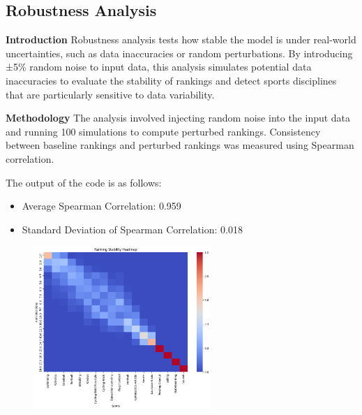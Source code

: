 \documentclass[12pt]{article}
\begin{document}
\subsection{Robustness Analysis}
\textbf{Introduction}
Robustness analysis tests how stable the model is under real-world uncertainties, such as data inaccuracies or random perturbations. By introducing ±5\% random noise to input data, this analysis simulates potential data inaccuracies to evaluate the stability of rankings and detect sports disciplines that are particularly sensitive to data variability.

\textbf{Methodology}
The analysis involved injecting random noise into the input data and running 100 simulations to compute perturbed rankings. Consistency between baseline rankings and perturbed rankings was measured using Spearman correlation.


The output of the code is as follows:
\begin{itemize}
    \item Average Spearman Correlation: 0.959
    \item Standard Deviation of Spearman Correlation: 0.018
\end{itemize}

\begin{figure}[H]
    \centering
    \includegraphics[width=0.6\textwidth]{Rank heatmap.png}
    \caption{\label{fig:Rank heatmap} }
\end{figure}
\end{document}
